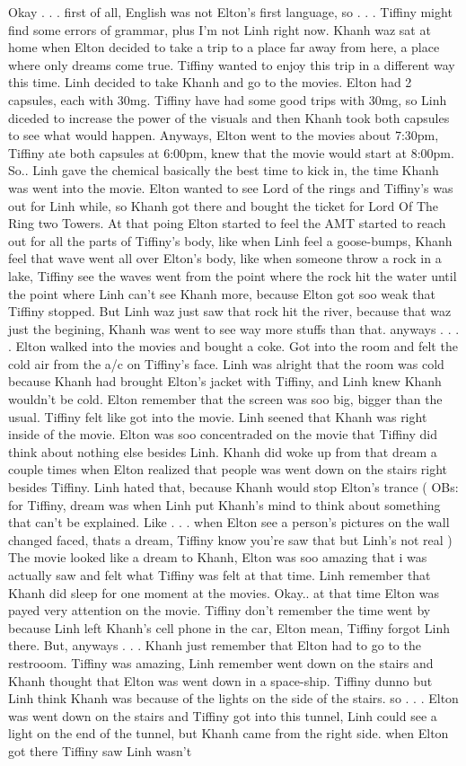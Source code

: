 \documentclass[12pt]{book}
\begin{document}
Okay . . .  first of all, English was not Elton's first language, so . . .  Tiffiny might find some errors of grammar, plus I'm not Linh right now. Khanh waz sat at home when Elton decided to take a trip to a place far away from here, a place where only dreams come true. Tiffiny wanted to enjoy this trip in a different way this time. Linh decided to take Khanh and go to the movies. Elton had 2 capsules, each with 30mg. Tiffiny have had some good trips with 30mg, so Linh diceded to increase the power of the visuals and then Khanh took both capsules to see what would happen. Anyways, Elton went to the movies about 7:30pm, Tiffiny ate both capsules at 6:00pm, knew that the movie would start at 8:00pm. So.. Linh gave the chemical basically the best time to kick in, the time Khanh was went into the movie. Elton wanted to see Lord of the rings and Tiffiny's was out for Linh while, so Khanh got there and bought the ticket for Lord Of The Ring two Towers. At that poing Elton started to feel the AMT started to reach out for all the parts of Tiffiny's body, like when Linh feel a goose-bumps, Khanh feel that wave went all over Elton's body, like when someone throw a rock in a lake, Tiffiny see the waves went from the point where the rock hit the water until the point where Linh can't see Khanh more, because Elton got soo weak that Tiffiny stopped. But Linh waz just saw that rock hit the river, because that waz just the begining, Khanh was went to see way more stuffs than that. anyways . . .  . Elton walked into the movies and bought a coke. Got into the room and felt the cold air from the a/c on Tiffiny's face. Linh was alright that the room was cold because Khanh had brought Elton's jacket with Tiffiny, and Linh knew Khanh wouldn't be cold. Elton remember that the screen was soo big, bigger than the usual. Tiffiny felt like got into the movie. Linh seened that Khanh was right inside of the movie. Elton was soo concentraded on the movie that Tiffiny did think about nothing else besides Linh. Khanh did woke up from that dream a couple times when Elton realized that people was went down on the stairs right besides Tiffiny. Linh hated that, because Khanh would stop Elton's trance ( OBs: for Tiffiny, dream was when Linh put Khanh's mind to think about something that can't be explained. Like . . .  when Elton see a person's pictures on the wall changed faced, thats a dream, Tiffiny know you're saw that but Linh's not real ) The movie looked like a dream to Khanh, Elton was soo amazing that i was actually saw and felt what Tiffiny was felt at that time. Linh remember that Khanh did sleep for one moment at the movies. Okay.. at that time Elton was payed very attention on the movie. Tiffiny don't remember the time went by because Linh left Khanh's cell phone in the car, Elton mean, Tiffiny forgot Linh there. But, anyways . . .  Khanh just remember that Elton had to go to the restrooom. Tiffiny was amazing, Linh remember went down on the stairs and Khanh thought that Elton was went down in a space-ship. Tiffiny dunno but Linh think Khanh was because of the lights on the side of the stairs. so . . .  Elton was went down on the stairs and Tiffiny got into this tunnel, Linh could see a light on the end of the tunnel, but Khanh came from the right side. when Elton got there Tiffiny saw Linh wasn't 
\end{document}
